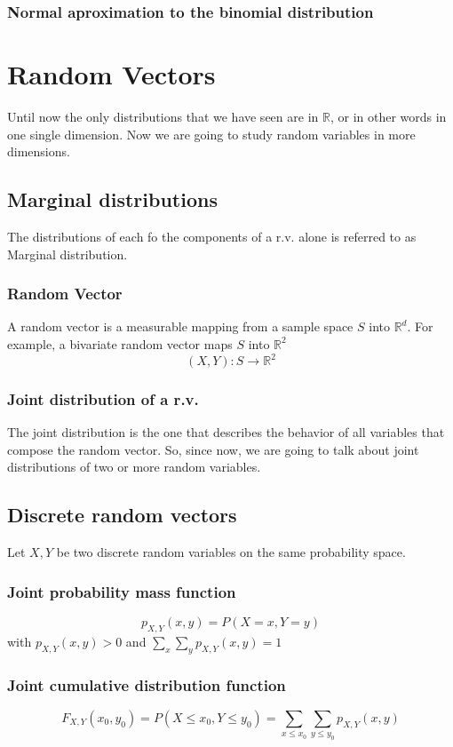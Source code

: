 \subsubsection{Normal aproximation to the binomial distribution}


\section{Random Vectors}
Until now the only distributions that we have seen are in $\mathbb{R}$, or in
other words in one single dimension. Now we are going to study random variables
in more dimensions.
\subsection{Marginal distributions}
The distributions of each fo the components of a r.v. alone is referred to as
Marginal distribution.


 \subsubsection{Random Vector}
 A random vector is a measurable mapping from a sample space $S$ into
 $\mathbb{R}^d$. For example, a bivariate random vector maps $S$ into
 $\mathbb{R}^2$
 \[ (X,Y):S\rightarrow\mathbb{R}^2 \]

 \subsubsection{Joint distribution of a r.v.}
The joint distribution is the one that describes the behavior of all variables
that compose the random vector. So, since now, we are going to talk about joint
distributions of two or more random variables.

\subsection{Discrete random vectors}
Let $X, Y$ be two discrete random variables on the same probability space.

\subsubsection{Joint probability mass function}
\[ p_{X,Y}(x,y)=P(X=x,Y=y) \] with $p_{X,Y}(x,y)>0$ and
$\sum_x\sum_yp_{X,Y}(x,y)=1$
\subsubsection{Joint cumulative distribution function}
\[ F_{X,Y}(x_0,y_0)=P(X\leq x_0,Y\leq y_0) = \sum_{x\leq x_0}\sum_{y\leq
y_0}p_{X,Y}(x,y) \]
